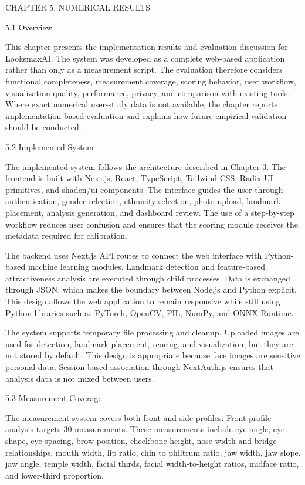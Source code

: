 CHAPTER 5. NUMERICAL RESULTS

5.1  Overview

This chapter presents the implementation results and evaluation discussion for LooksmaxAI. The system was developed as a complete web-based application rather than only as a measurement script. The evaluation therefore considers functional completeness, measurement coverage, scoring behavior, user workflow, visualization quality, performance, privacy, and comparison with existing tools. Where exact numerical user-study data is not available, the chapter reports implementation-based evaluation and explains how future empirical validation should be conducted.

5.2  Implemented System

The implemented system follows the architecture described in Chapter 3. The frontend is built with Next.js, React, TypeScript, Tailwind CSS, Radix UI primitives, and shadcn/ui components. The interface guides the user through authentication, gender selection, ethnicity selection, photo upload, landmark placement, analysis generation, and dashboard review. The use of a step-by-step workflow reduces user confusion and ensures that the scoring module receives the metadata required for calibration.

The backend uses Next.js API routes to connect the web interface with Python-based machine learning modules. Landmark detection and feature-based attractiveness analysis are executed through child processes. Data is exchanged through JSON, which makes the boundary between Node.js and Python explicit. This design allows the web application to remain responsive while still using Python libraries such as PyTorch, OpenCV, PIL, NumPy, and ONNX Runtime.

The system supports temporary file processing and cleanup. Uploaded images are used for detection, landmark placement, scoring, and visualization, but they are not stored by default. This design is appropriate because face images are sensitive personal data. Session-based association through NextAuth.js ensures that analysis data is not mixed between users.

5.3  Measurement Coverage

The measurement system covers both front and side profiles. Front-profile analysis targets 30 measurements. These measurements include eye angle, eye shape, eye spacing, brow position, cheekbone height, nose width and bridge relationships, mouth width, lip ratio, chin to philtrum ratio, jaw width, jaw slope, jaw angle, temple width, facial thirds, facial width-to-height ratios, midface ratio, and lower-third proportion.

